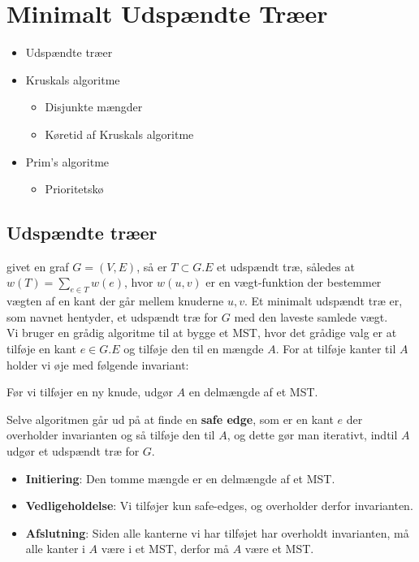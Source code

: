 \section{Minimalt Udspændte Træer}
\hrulefill

\begin{itemize}
\item Udspændte træer
\item Kruskals algoritme
  \begin{itemize}
  \item Disjunkte mængder
  \item Køretid af Kruskals algoritme
  \end{itemize}
\item Prim's algoritme
  \begin{itemize}
    \item Prioritetskø
  \end{itemize}
\end{itemize}


\newpage
\subsection{Udspændte træer}
givet en graf $G = (V, E)$, så er $T \subset G.E$ et udspændt træ, således at $w(T) = \sum_{e \in T}w(e)$, hvor $w(u,v)$ er en vægt-funktion der bestemmer vægten af en kant der går mellem knuderne $u,v$. Et minimalt udspændt træ er, som navnet hentyder, et udspændt træ for $G$ med den laveste samlede vægt.\\

Vi bruger en grådig algoritme til at bygge et MST, hvor det grådige valg er at tilføje en kant $e \in G.E$ og tilføje den til en mængde $A$. For at tilføje kanter til $A$ holder vi øje med følgende invariant:
\begin{center}
Før vi tilføjer en ny knude, udgør $A$ en delmængde af et MST.
\end{center}

Selve algoritmen går ud på at finde en \textbf{safe edge}, som er en kant $e$ der overholder invarianten og så tilføje den til $A$, og dette gør man iterativt, indtil $A$ udgør et udspændt træ for $G$.\\
\begin{itemize}
\item \textbf{Initiering}: Den tomme mængde er en delmængde af et MST.\\
\item \textbf{Vedligeholdelse}: Vi tilføjer kun safe-edges, og overholder derfor invarianten.\\
\item \textbf{Afslutning}: Siden alle kanterne vi har tilføjet har overholdt invarianten, må alle kanter i $A$ være i et MST, derfor må $A$ være et MST.
\end{itemize}

